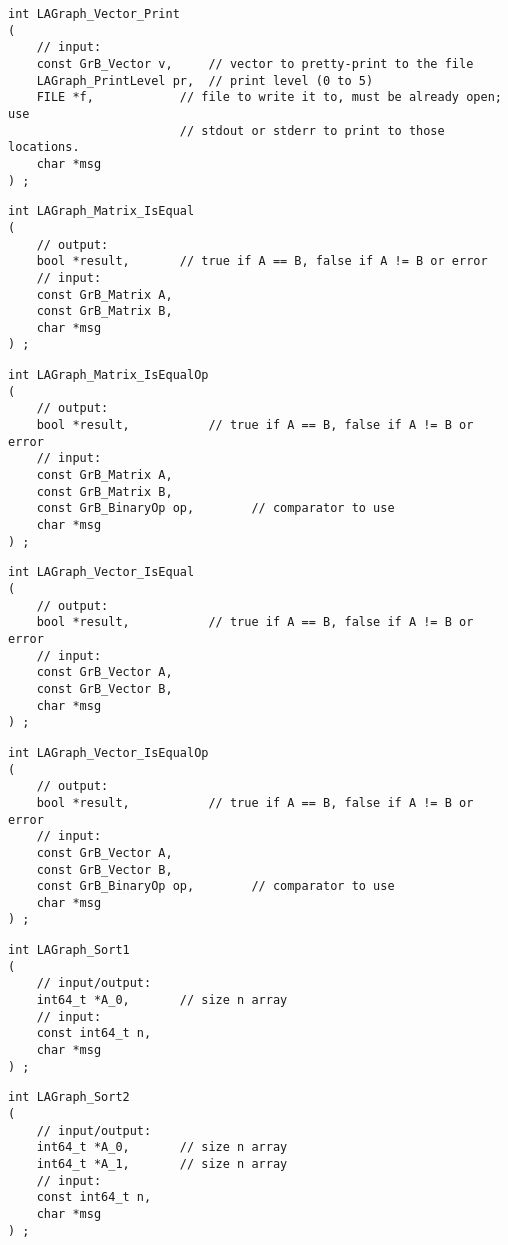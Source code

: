 \begin{verbatim}
int LAGraph_Vector_Print
(
    // input:
    const GrB_Vector v,     // vector to pretty-print to the file
    LAGraph_PrintLevel pr,  // print level (0 to 5)
    FILE *f,            // file to write it to, must be already open; use
                        // stdout or stderr to print to those locations.
    char *msg
) ;
\end{verbatim}




\begin{verbatim}
int LAGraph_Matrix_IsEqual
(
    // output:
    bool *result,       // true if A == B, false if A != B or error
    // input:
    const GrB_Matrix A,
    const GrB_Matrix B,
    char *msg
) ;
\end{verbatim}




\begin{verbatim}
int LAGraph_Matrix_IsEqualOp
(
    // output:
    bool *result,           // true if A == B, false if A != B or error
    // input:
    const GrB_Matrix A,
    const GrB_Matrix B,
    const GrB_BinaryOp op,        // comparator to use
    char *msg
) ;
\end{verbatim}




\begin{verbatim}
int LAGraph_Vector_IsEqual
(
    // output:
    bool *result,           // true if A == B, false if A != B or error
    // input:
    const GrB_Vector A,
    const GrB_Vector B,
    char *msg
) ;
\end{verbatim}




\begin{verbatim}
int LAGraph_Vector_IsEqualOp
(
    // output:
    bool *result,           // true if A == B, false if A != B or error
    // input:
    const GrB_Vector A,
    const GrB_Vector B,
    const GrB_BinaryOp op,        // comparator to use
    char *msg
) ;
\end{verbatim}




\begin{verbatim}
int LAGraph_Sort1
(
    // input/output:
    int64_t *A_0,       // size n array
    // input:
    const int64_t n,
    char *msg
) ;
\end{verbatim}




\begin{verbatim}
int LAGraph_Sort2
(
    // input/output:
    int64_t *A_0,       // size n array
    int64_t *A_1,       // size n array
    // input:
    const int64_t n,
    char *msg
) ;
\end{verbatim}





